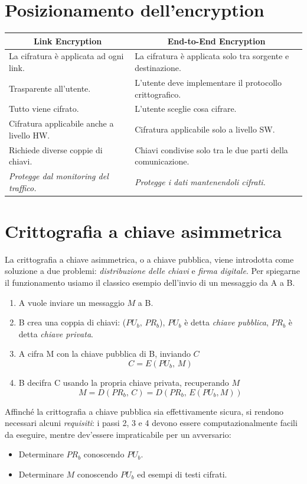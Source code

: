 \documentclass[a4paper, 11pt, twoside, openright, fleqn]{report}
\begin{document}
\section{Posizionamento dell'encryption}
\begin{table}[htp]
\renewcommand{\arraystretch}{1.3}
\begin{tabularx}{\linewidth}{X|X}
	\multicolumn{1}{c}{Link Encryption} & \multicolumn{1}{c}{End-to-End Encryption}\\
	\toprule
	La cifratura è applicata ad ogni link. & La cifratura è applicata solo tra sorgente e destinazione.\\
	Trasparente all'utente. & L'utente deve implementare il protocollo crittografico.\\
	Tutto viene cifrato. & L'utente sceglie cosa cifrare.\\
	Cifratura applicabile anche a livello HW. & Cifratura applicabile solo a livello SW.\\
	Richiede diverse coppie di chiavi. & Chiavi condivise solo tra le due parti della comunicazione.\\
	\emph{Protegge dal monitoring del traffico.} & \emph{Protegge i dati mantenendoli cifrati.}
\end{tabularx}
\end{table}

\section{Crittografia a chiave asimmetrica}
La crittografia a chiave asimmetrica, o a chiave pubblica, viene introdotta come soluzione a due problemi: \emph{distribuzione delle chiavi} e \emph{firma digitale}. Per spiegarne il funzionamento usiamo il classico esempio dell'invio di un messaggio da A a B. 
\begin{enumerate}
	\item A vuole inviare un messaggio $M$ a B.
	\item B crea una coppia di chiavi: ($PU_b,\,PR_b$), $PU_b$ è detta \emph{chiave pubblica}, $PR_b$ è detta \emph{chiave privata}.
	\item A cifra M con la chiave pubblica di B, inviando $C$
	\begin{equation*}
		C=E(PU_b,\,M)
	\end{equation*}
	\item B decifra C usando la propria chiave privata, recuperando $M$
	\begin{equation*}
		M = D(PR_b,\,C) = D(PR_b,\,E(PU_b, M))
	\end{equation*}
\end{enumerate}
\noindent Affinché la crittografia a chiave pubblica sia effettivamente sicura, si rendono necessari alcuni \emph{requisiti}: i passi 2, 3 e 4 devono essere computazionalmente facili da eseguire, mentre dev'essere impraticabile per un avversario:
\begin{itemize}
	\item Determinare $PR_b$ conoscendo $PU_b$.
	\item Determinare $M$ conoscendo $PU_b$ ed esempi di testi cifrati.
\end{itemize}
\end{document}
